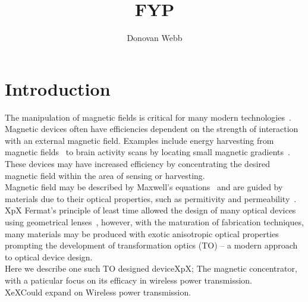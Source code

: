 \documentclass[11pt]{iopart}
\begin{document}
\title[]{FYP}

\author{Donovan Webb}

\address{Department of Physics,
University of Bath, Bath BA2 7AY, United Kingdom}

\begin{abstract}
\end{abstract}
\section{Introduction}

The manipulation of magnetic fields is critical for many modern
technologies~\cite{REVIEW_MAGNETISM}. Magnetic devices often have
efficiencies dependent on the strength of interaction with an external
magnetic field. Examples include energy harvesting from magnetic
fields~\cite{HARVESTING} to brain activity scans by locating small
magnetic gradients~\cite{BRAIN}. These devices may have increased
efficiency by concentrating the desired magnetic field within the area
of sensing or harvesting. \\

Magnetic field may be described by Maxwell's equations~\cite{MAXWELL}
and are guided by materials due to their optical properties, such as
permitivity and permeability~\cite{OPTICAL PROPERITES}. XpX Fermat's
principle of least time allowed the design of many optical devices
using geometrical lenses~\cite{FERMAT}, however, with the maturation
of fabrication techniques, many materials may be produced with exotic
anisotropic optical properties~\cite{META} prompting the development
of transformation optics (TO) -- a modern approach to optical device
design.\\

Here we describe one such TO designed deviceXpX; The magnetic
concentrator, with a paticular focus on its efficacy in wireless power
transmission. \\

XeXCould expand on Wireless power transmission.
\end{document}
